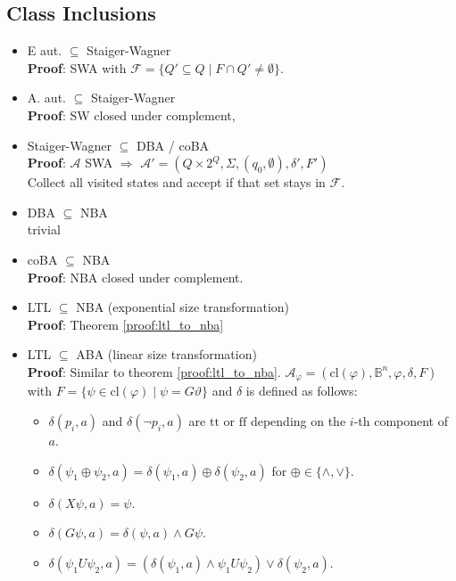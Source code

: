 \documentclass{article}
\begin{document}
\subsection{Class Inclusions}
\begin{itemize}
	\item E aut. $\subseteq$ Staiger-Wagner \\
		\textbf{Proof}: SWA with $\mathcal{F} = \{ Q' \subseteq Q \mid F \cap Q' \neq \emptyset \}$.
    \item A. aut. $\subseteq$ Staiger-Wagner \\
    	\textbf{Proof}: SW closed under complement,
    \item Staiger-Wagner $\subseteq$ DBA / coBA \\
    	\textbf{Proof}: $\mathcal{A}$ SWA $\Rightarrow$ $\mathcal{A}' = (Q \times 2^Q, \Sigma, (q_0, \emptyset), \delta', F')$ \\
    	Collect all visited states and accept if that set stays in $\mathcal{F}$.
    \item DBA $\subseteq$ NBA \\
    	trivial
    \item coBA $\subseteq$ NBA \\
    	\textbf{Proof}: NBA closed under complement.
    \item LTL $\subseteq$ NBA (exponential size transformation) \\
    	\textbf{Proof}: Theorem \ref{proof:ltl_to_nba}
    \item LTL $\subseteq$ ABA (linear size transformation) \\
    	\textbf{Proof}: Similar to theorem \ref{proof:ltl_to_nba}. $\mathcal{A}_\varphi = (\text{cl}(\varphi), \mathbb{B}^n, \varphi, \delta, F)$ with $F = \{ \psi \in \text{cl}(\varphi) \mid \psi = G \vartheta \}$ and $\delta$ is defined as follows:
    	\begin{itemize}
    		\item $\delta(p_i, a)$ and $\delta(\neg p_i, a)$ are $\text{tt}$ or $\text{ff}$ depending on the $i$-th component of $a$.
    		\item $\delta(\psi_1 \oplus \psi_2, a) = \delta(\psi_1, a) \oplus \delta(\psi_2, a)$ for $\oplus \in \{\land, \lor\}$.
    		\item $\delta(X \psi, a) = \psi$.
    		\item $\delta(G \psi, a) = \delta(\psi, a) \land G \psi$.
    		\item $\delta(\psi_1 U \psi_2, a) = (\delta(\psi_1, a) \land \psi_1 U \psi_2) \lor \delta(\psi_2, a)$.
    	\end{itemize}
\end{itemize}
\end{document}
